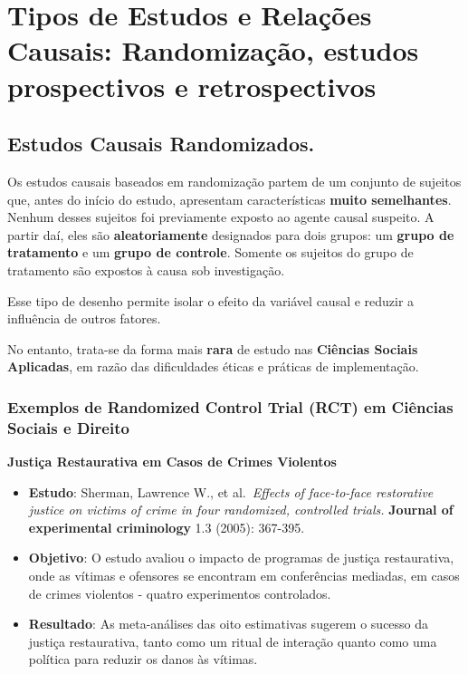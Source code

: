 \documentclass[
  letterpaper,
  DIV=11,
  numbers=noendperiod]{scrreprt}
\begin{document}
\section{Tipos de Estudos e Relações Causais: Randomização, estudos
prospectivos e
retrospectivos}\label{tipos-de-estudos-e-relauxe7uxf5es-causais-randomizauxe7uxe3o-estudos-prospectivos-e-retrospectivos}

\subsection{Estudos Causais
Randomizados.}\label{estudos-causais-randomizados.}

Os estudos causais baseados em randomização partem de um conjunto de
sujeitos que, antes do início do estudo, apresentam características
\textbf{muito semelhantes}. Nenhum desses sujeitos foi previamente
exposto ao agente causal suspeito. A partir daí, eles são
\textbf{aleatoriamente} designados para dois grupos: um \textbf{grupo de
tratamento} e um \textbf{grupo de controle}. Somente os sujeitos do
grupo de tratamento são expostos à causa sob investigação.

Esse tipo de desenho permite isolar o efeito da variável causal e
reduzir a influência de outros fatores.

No entanto, trata-se da forma mais \textbf{rara} de estudo nas
\textbf{Ciências Sociais Aplicadas}, em razão das dificuldades éticas e
práticas de implementação.

\subsubsection{Exemplos de Randomized Control Trial (RCT) em Ciências
Sociais e
Direito}\label{exemplos-de-randomized-control-trial-rct-em-ciuxeancias-sociais-e-direito}

\textbf{Justiça Restaurativa em Casos de Crimes Violentos}

\begin{itemize}
\item
  \textbf{Estudo}: Sherman, Lawrence W., et al.~\emph{Effects of
  face-to-face restorative justice on victims of crime in four
  randomized, controlled trials.} \textbf{Journal of experimental
  criminology} 1.3 (2005): 367-395.
\item
  \textbf{Objetivo}: O estudo avaliou o impacto de programas de justiça
  restaurativa, onde as vítimas e ofensores se encontram em conferências
  mediadas, em casos de crimes violentos - quatro experimentos
  controlados.
\item
  \textbf{Resultado}: As meta-análises das oito estimativas sugerem o
  sucesso da justiça restaurativa, tanto como um ritual de interação
  quanto como uma política para reduzir os danos às vítimas.
\end{itemize}
\end{document}
